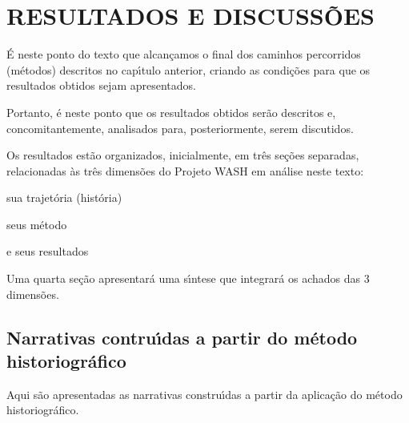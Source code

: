 \documentclass[
12pt,		%
openright,	%
twoside,  %
a4paper,			%
chapter=TITLE,		%
english,			%
french,				%
spanish,			%
brazil				%
]{USPSC-classe/USPSC_RedarTex}
\begin{document}
\chapter[RESULTADOS E DISCUSS\~OES]{RESULTADOS E DISCUSS\~OES}\label{RESULTADOS E DISCUSS\~OES}
\'E neste ponto do texto que alcan\c{c}amos o final dos caminhos percorridos (m\'etodos) descritos no cap\'{\i}tulo anterior, criando as condi\c{c}\~oes para que os resultados obtidos sejam apresentados.










Portanto, \'e neste ponto que os resultados obtidos ser\~ao descritos e, concomitantemente, analisados para, posteriormente, serem discutidos.










Os resultados est\~ao organizados, inicialmente, em tr\^es se\c{c}\~oes separadas, relacionadas \`as tr\^es dimens\~oes do Projeto WASH em an\'alise neste texto:











\begin{alineas}
\item sua trajet\'oria (hist\'oria)
\item seus m\'etodo
\item e seus resultados
\end{alineas}

Uma quarta se\c{c}\~ao apresentar\'a uma s\'{\i}ntese que integrar\'a os achados das 3 dimens\~oes.










\section[Narrativas contru\'{\i}das a partir do m\'etodo historiogr\'afico]{Narrativas contru\'{\i}das a partir do m\'etodo historiogr\'afico}\label{Narrativas contru\'{\i}das a partir do m\'etodo historiogr\'afico}
Aqui s\~ao apresentadas as narrativas constru\'{\i}das a partir da aplica\c{c}\~ao do m\'etodo historiogr\'afico.
\end{document}
